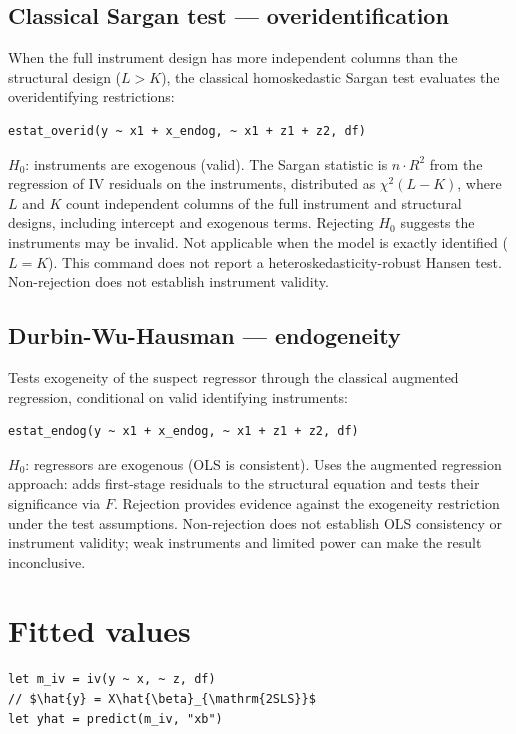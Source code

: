 \subsection{Classical Sargan test --- overidentification}

When the full instrument design has more independent columns than the
structural design ($L > K$), the classical homoskedastic Sargan test evaluates
the overidentifying restrictions:

\begin{lstlisting}
estat_overid(y ~ x1 + x_endog, ~ x1 + z1 + z2, df)
\end{lstlisting}

$H_0$: instruments are exogenous (valid). The Sargan statistic is
$n \cdot R^2$ from the regression of IV residuals on the instruments,
distributed as $\chi^2(L - K)$, where $L$ and $K$ count independent columns
of the full instrument and structural designs, including intercept and
exogenous terms. Rejecting $H_0$ suggests the
instruments may be invalid. Not applicable when the model is exactly
identified ($L = K$). This command does not report a heteroskedasticity-robust
Hansen test. Non-rejection does not establish instrument validity.

\subsection{Durbin-Wu-Hausman --- endogeneity}

Tests exogeneity of the suspect regressor through the classical augmented
regression, conditional on valid identifying instruments:

\begin{lstlisting}
estat_endog(y ~ x1 + x_endog, ~ x1 + z1 + z2, df)
\end{lstlisting}

$H_0$: regressors are exogenous (OLS is consistent). Uses the augmented
regression approach: adds first-stage residuals to the structural
equation and tests their significance via $F$. Rejection provides evidence
against the exogeneity restriction under the test assumptions. Non-rejection
does not establish OLS consistency or instrument validity; weak instruments
and limited power can make the result inconclusive.

\section{Fitted values}

\begin{lstlisting}
let m_iv = iv(y ~ x, ~ z, df)
// $\hat{y} = X\hat{\beta}_{\mathrm{2SLS}}$
let yhat = predict(m_iv, "xb")
\end{lstlisting}

